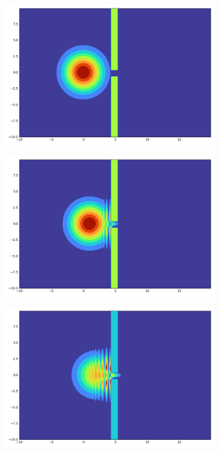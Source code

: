 \begin{figure}[h]
    \centering
    \begin{subfigure}{0.3\linewidth}
        \includegraphics[width=\linewidth]{5/0}
    \end{subfigure}
    \begin{subfigure}{0.3\linewidth}
        \includegraphics[width=\linewidth]{5/100}
    \end{subfigure}
    \begin{subfigure}{0.3\linewidth}
        \includegraphics[width=\linewidth]{5/200}

\end{subfigure}
\end{figure}
